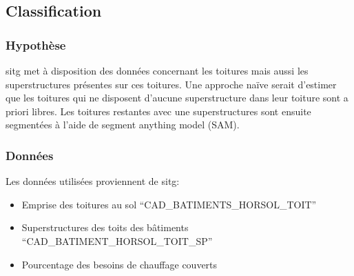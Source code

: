 \subsection{Classification}
\subsubsection{Hypothèse}
\acrshort{sitg} met à disposition des données concernant les toitures mais aussi les superstructures présentes sur ces toitures. Une approche naïve serait d'estimer que les toitures qui ne disposent d'aucune superstructure dans leur toiture sont a priori libres. Les toitures restantes avec une superstructures sont ensuite segmentées à l'aide de segment anything model (SAM).

\subsubsection{Données}
Les données utilisées proviennent de \acrshort{sitg}:
\begin{itemize}
    \item Emprise des toitures au sol ``CAD\_BATIMENTS\_HORSOL\_TOIT'' \cite{sitg_toits_nodate}
    \item Superstructures des toits des bâtiments ``CAD\_BATIMENT\_HORSOL\_TOIT\_SP'' \cite{sitg_superstructures_nodate}
    \item Pourcentage des besoins de chauffage couverts
\end{itemize}







